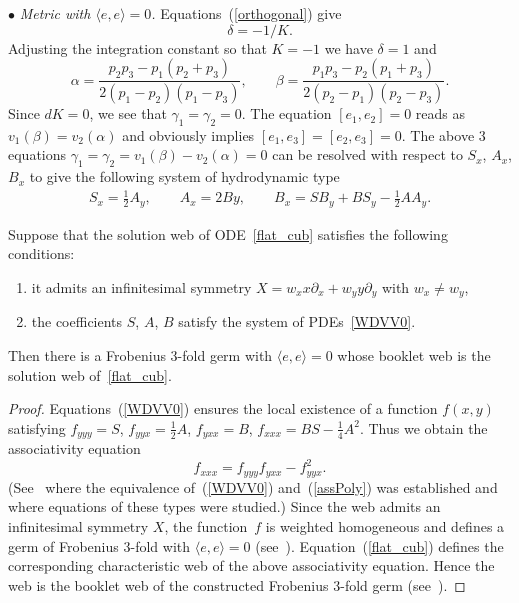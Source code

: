 \documentclass[pdftex]{sigma}
\begin{document}
$\bullet$ {\it Metric with $\langle e,e\rangle =0$.}
Equations~(\ref{orthogonal}) give
\begin{equation}\label{dfor0}
\delta=-1/K.
\end{equation} Adjusting the integration constant so that $K=-1$ we have $\delta =1$ and
\begin{equation}\label{alphabeta0}
\alpha =\frac{p_2p_3-p_1(p_2+p_3)}{2(p_1-p_2)(p_1-p_3)},\qquad \beta =\frac{p_1p_3-p_2(p_1+p_3)}{2(p_2-p_1)(p_2-p_3)}.
\end{equation}
Since $dK=0$, we see that $\gamma_1=\gamma_2=0$.
The equation $[e_1,e_2]=0$ reads as $v_1(\beta)=v_2(\alpha)$ and obviously implies $[e_1,e_3]=[e_2,e_3]=0$.
The above 3 equations $\gamma_1=\gamma_2=v_1(\beta)-v_2(\alpha)=0$
can be resolved with respect to $S_x$, $A_x$, $B_x$
to give the following system of hydrodynamic type
\begin{gather}\label{WDVV0}
S_x= \frac{1}{2}A_y,\qquad
A_x= 2By,\qquad
B_x= SB_y+BS_y-\frac{1}{2}AA_y.
\end{gather}
\begin{lemma}\label{web_ass_0}
Suppose that the solution web of ODE~\eqref{flat_cub} satisfies the following conditions:
\begin{enumerate}\itemsep=0pt
\item[$1)$] it admits an infinitesimal symmetry $X=w_xx\partial_x+w_yy\partial_y$ with $w_x\ne w_y$,
\item[$2)$] the coefficients $S$, $A$, $B$ satisfy the system of PDEs~\eqref{WDVV0}.
\end{enumerate}
Then there is a Frobenius $3$-fold germ with $\langle e,e\rangle =0$ whose booklet web is the solution web of~\eqref{flat_cub}.
\end{lemma}
\begin{proof}
Equations~(\ref{WDVV0}) ensures the local existence of a function $f(x,y)$ satisfying
$f_{yyy}=S$, $f_{yyx}=\frac{1}{2}A$, $f_{yxx}=B$, $f_{xxx}=BS-\frac{1}{4}A^2$.
Thus we obtain the associativity equation
\begin{equation}\label{assPoly}
f_{xxx}=f_{yyy}f_{yxx}-f^2_{yyx}.
\end{equation}
(See~\cite{MFa} where the equivalence of~(\ref{WDVV0}) and~(\ref{assPoly}) was established and~\cite{Al} where equations of these types were studied.)
Since the web admits an inf\/initesimal symmetry $X$, the function~$f$ is weighted homogeneous and def\/ines a germ of Frobenius $3$-fold with $\langle e,e\rangle =0$ (see~\cite{Df}). Equation~(\ref{flat_cub}) def\/ines the corresponding characteristic web of the above associativity equation. Hence the web is the booklet web of the constructed Frobenius $3$-fold germ (see~\cite{Aw}).
\end{proof}
\end{document}
